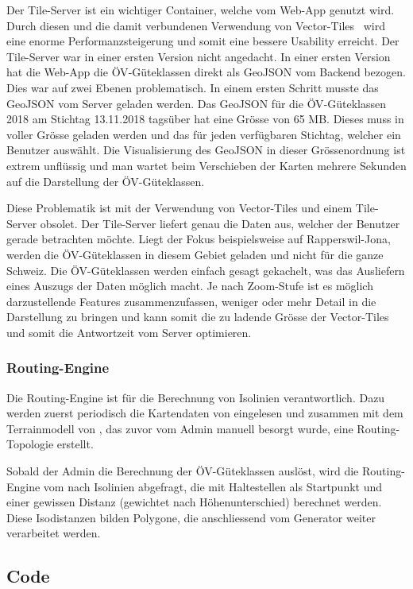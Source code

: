 Der Tile-Server ist ein wichtiger Container, welche vom Web-App genutzt wird.
Durch diesen und die damit verbundenen Verwendung von Vector-Tiles~\cite{geometalab_vectortiles} wird eine enorme Performanzsteigerung und somit eine bessere Usability erreicht.
Der Tile-Server war in einer ersten Version nicht angedacht.
In einer ersten Version hat die Web-App die \acs{ÖV}-Güteklassen direkt als GeoJSON vom Backend bezogen.
Dies war auf zwei Ebenen problematisch.
In einem ersten Schritt musste das GeoJSON vom Server geladen werden.
Das GeoJSON für die \acs{ÖV}-Güteklassen 2018 am Stichtag 13.11.2018 tagsüber hat eine Grösse von 65 MB.
Dieses muss in voller Grösse geladen werden und das für jeden verfügbaren Stichtag, welcher ein Benutzer auswählt.
Die Visualisierung des GeoJSON in dieser Grössenordnung ist extrem unflüssig und man wartet beim Verschieben der Karten mehrere Sekunden auf die Darstellung der \acs{ÖV}-Güteklassen.

Diese Problematik ist mit der Verwendung von Vector-Tiles und einem Tile-Server obsolet.
Der Tile-Server liefert genau die Daten aus, welcher der Benutzer gerade betrachten möchte.
Liegt der Fokus beispielsweise auf Rapperswil-Jona, werden die \acs{ÖV}-Güteklassen in diesem Gebiet geladen und nicht für die ganze Schweiz.
Die \acs{ÖV}-Güteklassen werden einfach gesagt gekachelt, was das Ausliefern eines Auszugs der Daten möglich macht.
Je nach Zoom-Stufe ist es möglich darzustellende Features zusammenzufassen, weniger oder mehr Detail in die Darstellung zu bringen und kann somit die zu ladende Grösse der Vector-Tiles und somit die Antwortzeit vom Server optimieren.

\subsubsection{Routing-Engine}
\label{container:Routing-Engine}

Die Routing-Engine ist für die Berechnung von Isolinien verantwortlich.
Dazu werden zuerst periodisch die Kartendaten von  eingelesen und zusammen mit dem \gls{Terrainmodell} von , das zuvor vom Admin manuell besorgt wurde, eine Routing-Topologie erstellt.

Sobald der Admin die Berechnung der ÖV-Güteklassen auslöst, wird die Routing-Engine vom  nach Isolinien abgefragt, die mit Haltestellen als Startpunkt und einer gewissen Distanz (gewichtet nach Höhenunterschied) berechnet werden.
Diese Isodistanzen bilden Polygone, die anschliessend vom Generator weiter verarbeitet werden.


\subsection{Code}
\label{Architektur:Code}

